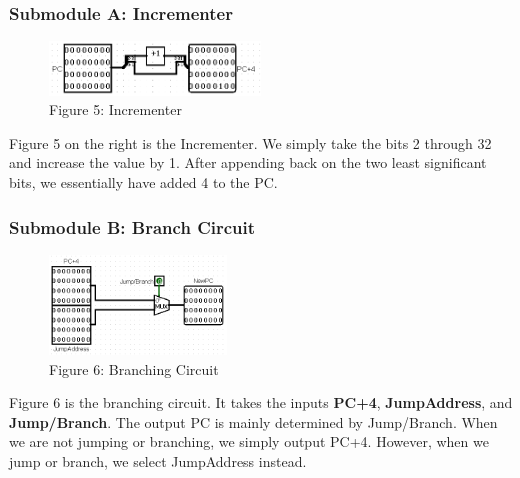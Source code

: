 \documentclass{article}
\begin{document}
\subsubsection{Submodule A: Incrementer}
\begin{figure}
\vspace{-1.4cm}
\begin{center}
\includegraphics[width=0.5\textwidth]{Incrementer.png}\\
Figure 5: Incrementer
\end{center}
\vspace{-13mm}
\end{figure}
Figure 5 on the right is the Incrementer. We simply take the bits 2 through 32 and increase the value by 1. After appending back on the two least significant bits, we essentially have added 4 to the PC.

\subsubsection{Submodule B: Branch Circuit}
\begin{figure}
\vspace{-1.5cm}
\begin{center}
\includegraphics[width=0.42\textwidth]{FetchBranch.png} \\
Figure 6: Branching Circuit
\end{center}
\vspace{-1.9cm}
\end{figure}
Figure 6 is the branching circuit. It takes the inputs \textbf{PC+4}, \textbf{JumpAddress}, and \textbf{Jump/Branch}. The output PC is mainly determined by Jump/Branch. When we are not jumping or branching, we simply output PC+4. However, when we jump or branch, we select JumpAddress instead.
\end{document}
